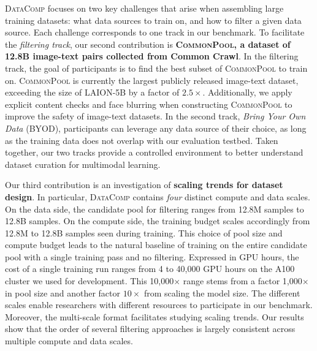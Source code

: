\documentclass[dvipsnames,11pt]{article}
\newcommand{\datanet}{\textsc{DataComp}\xspace}
\newcommand{\byod}{\textsc{BYOD}\xspace}
\newcommand{\pool}{\textsc{CommonPool}\xspace}
\begin{document}
\datanet focuses on two key challenges that arise when assembling large training datasets: what data sources to train on, and how to filter a given data source.
Each challenge corresponds to one track in our benchmark.
To facilitate the \emph{filtering track}, our second contribution is \textbf{\pool, a dataset of 12.8B image-text pairs collected from Common Crawl}.
In the filtering track, the goal of participants is to find the best subset of \pool to train on.
\pool is currently the largest publicly released image-text dataset, exceeding the size of LAION-5B by a factor of $2.5\times$.
Additionally, we apply explicit content checks and face blurring when constructing \pool to improve the safety of image-text datasets.
In the second track, \emph{Bring Your Own Data} (\byod), participants can leverage any data source of their choice, as long as the training data does not overlap with our evaluation testbed.
Taken together, our two tracks provide a controlled environment to better understand dataset curation for multimodal learning.


Our third contribution is an investigation of \textbf{scaling trends for dataset design}. 
In particular, \datanet contains \emph{four} distinct compute and data scales.
On the data side, the candidate pool for filtering ranges from 12.8M samples to 12.8B samples.
On the compute side, the training budget scales accordingly from 12.8M to 12.8B samples seen during training.
This choice of pool size and compute budget leads to the natural baseline of training on the entire candidate pool with a single training pass and no filtering.
Expressed in GPU hours, the cost of a single training run ranges from 4 to 40,000 GPU hours on the A100 cluster we used for development.
This 10,000$\times$ range stems from a factor 1,000$\times$ in pool size and another factor $10\times$ from scaling the model size.
The different scales enable researchers with different resources to participate in our benchmark.
Moreover, the multi-scale format facilitates studying scaling trends.
Our results show that the order of several filtering approaches is largely consistent across 
multiple compute and data scales.
\end{document}

